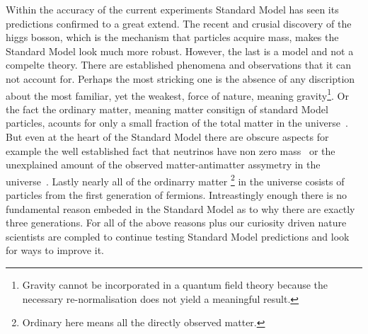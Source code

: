 Within the accuracy of the current experiments Standard Model has seen its predictions confirmed to a great extend.
The recent and crusial discovery of the higgs bosson, which is the mechanism that particles acquire mass, makes the Standard Model look
much more robust. However, the last is a model and not a compelte theory. There are established phenomena and observations that it can not
account for. Perhaps the most stricking one is the absence of any discription about the most familiar, yet the weakest, force of nature,
meaning gravity\footnote{Gravity cannot be incorporated in a quantum field theory because the necessary re-normalisation does not yield a
meaningful result.}.
Or the fact the ordinary matter, meaning matter consitign of standard Model particles, acounts for only a small fraction of the total matter
in the universe~\cite{dmatter-Hinshaw}. But even at the heart of the Standard Model there are obscure aspects for example the well established fact
that neutrinos have non zero mass~\cite{nu-mass-superkam,nu-mass-kamland,nu-mass-sno,nu-mass-daya} or the unexplained amount of the observed
matter-antimatter assymetry in the universe~\cite{more-cpv-huet,more-cpv-gavela_I,more-cpv-gavela_II}.
Lastly nearly all of the ordinarry matter \footnote{Ordinary here means all the directly observed matter.} in the universe cosists of
particles from the first generation of fermions. Intreastingly enough there is no fundamental reason embeded in the Standard Model
as to why there are exactly three generations. For all of the above reasons plus our curiosity driven nature scientists are compled
to continue testing Standard Model predictions and look for ways to improve it.

